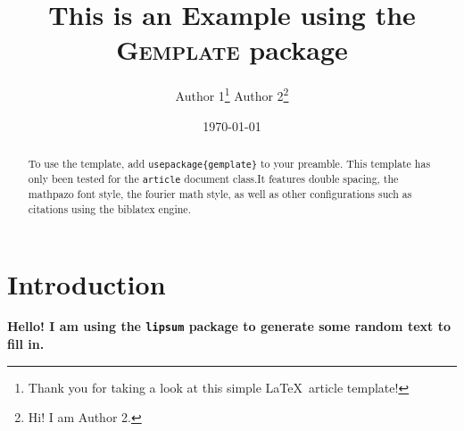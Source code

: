 \documentclass[12pt]{article}
\title{This is an Example using the \textsc{Gemplate} package}
\author{Author 1\thanks{\protect\linespread{1}\protect\selectfont Thank you for taking a look at this simple \LaTeX \ article template!} \hspace{15ex}
Author 2\thanks{\protect\linespread{1}\protect\selectfont Hi! I am Author 2.}}
\date{\today}
\begin{document}
\maketitle

\begin{abstract}
    To use the template, add \texttt{usepackage\{gemplate\}} to your preamble. This template has only been tested for the \texttt{article} document class.It features double spacing, the mathpazo font style, the fourier math style, as well as other configurations such as citations using the biblatex engine.
\end{abstract}

\newpage

\section{Introduction}
\textbf{Hello! I am using the \texttt{lipsum} package to generate some random text to fill in.} ~\\

\lipsum[2-3]









\newpage
\printbibliography
\end{document}

